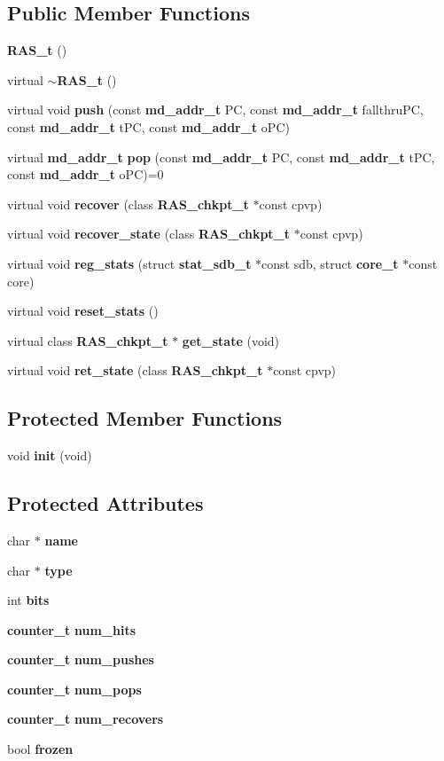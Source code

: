 \subsection*{Public Member Functions}
\begin{CompactItemize}
\item 
{\bf RAS\_\-t} ()
\item 
virtual {\bf $\sim$RAS\_\-t} ()
\item 
virtual void {\bf push} (const {\bf md\_\-addr\_\-t} PC, const {\bf md\_\-addr\_\-t} fallthruPC, const {\bf md\_\-addr\_\-t} tPC, const {\bf md\_\-addr\_\-t} oPC)
\item 
virtual {\bf md\_\-addr\_\-t} {\bf pop} (const {\bf md\_\-addr\_\-t} PC, const {\bf md\_\-addr\_\-t} tPC, const {\bf md\_\-addr\_\-t} oPC)=0
\item 
virtual void {\bf recover} (class {\bf RAS\_\-chkpt\_\-t} $\ast$const cpvp)
\item 
virtual void {\bf recover\_\-state} (class {\bf RAS\_\-chkpt\_\-t} $\ast$const cpvp)
\item 
virtual void {\bf reg\_\-stats} (struct {\bf stat\_\-sdb\_\-t} $\ast$const sdb, struct {\bf core\_\-t} $\ast$const core)
\item 
virtual void {\bf reset\_\-stats} ()
\item 
virtual class {\bf RAS\_\-chkpt\_\-t} $\ast$ {\bf get\_\-state} (void)
\item 
virtual void {\bf ret\_\-state} (class {\bf RAS\_\-chkpt\_\-t} $\ast$const cpvp)
\end{CompactItemize}
\subsection*{Protected Member Functions}
\begin{CompactItemize}
\item 
void {\bf init} (void)
\end{CompactItemize}
\subsection*{Protected Attributes}
\begin{CompactItemize}
\item 
char $\ast$ {\bf name}
\item 
char $\ast$ {\bf type}
\item 
int {\bf bits}
\item 
{\bf counter\_\-t} {\bf num\_\-hits}
\item 
{\bf counter\_\-t} {\bf num\_\-pushes}
\item 
{\bf counter\_\-t} {\bf num\_\-pops}
\item 
{\bf counter\_\-t} {\bf num\_\-recovers}
\item 
bool {\bf frozen}
\end{CompactItemize}
